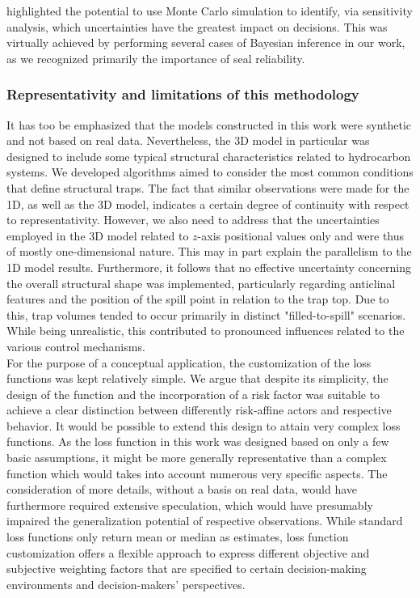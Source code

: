 	\citet{bratvold2010making} highlighted the potential to use Monte Carlo simulation to identify, via sensitivity analysis, which uncertainties have the greatest impact on decisions. This was virtually achieved by performing several cases of Bayesian inference in our work, as we recognized primarily the importance of seal reliability.		
	\subsubsection{Representativity and limitations of this methodology}
	It has too be emphasized that the models constructed in this work were synthetic and not based on real data. Nevertheless, the 3D model in particular was designed to include some typical structural characteristics related to hydrocarbon systems. We developed algorithms aimed to consider the most common conditions that define structural traps. The fact that similar observations were made for the 1D, as well as the 3D model, indicates a certain degree of continuity with respect to representativity. However, we also need to address that the uncertainties employed in the 3D model related to $z$-axis positional values only and were thus of mostly  one-dimensional nature. This may in part explain the parallelism to the 1D model results. Furthermore, it follows that no effective uncertainty concerning the overall structural shape was implemented, particularly regarding anticlinal features and the position of the spill point in relation to the trap top. Due to this, trap volumes tended to occur primarily in distinct "filled-to-spill" scenarios. While being unrealistic, this contributed to pronounced influences related to the various control mechanisms.\\	
	For the purpose of a conceptual application, the customization of the loss functions was kept relatively simple. We argue that despite its simplicity, the design of the function and the incorporation of a risk factor was suitable to achieve a clear distinction between differently risk-affine actors and respective behavior. It would be possible to extend this design to attain very complex loss functions. As the loss function in this work was designed based on only a few basic assumptions, it might be more generally representative than a complex function which would takes into account numerous very specific aspects. The consideration of more details, without a basis on real data, would have furthermore required extensive speculation, which would have presumably impaired the generalization potential of respective observations. While standard loss functions only return mean or median as estimates, loss function customization offers a flexible approach to express different objective and subjective weighting factors that are specified to certain decision-making environments and decision-makers' perspectives.
